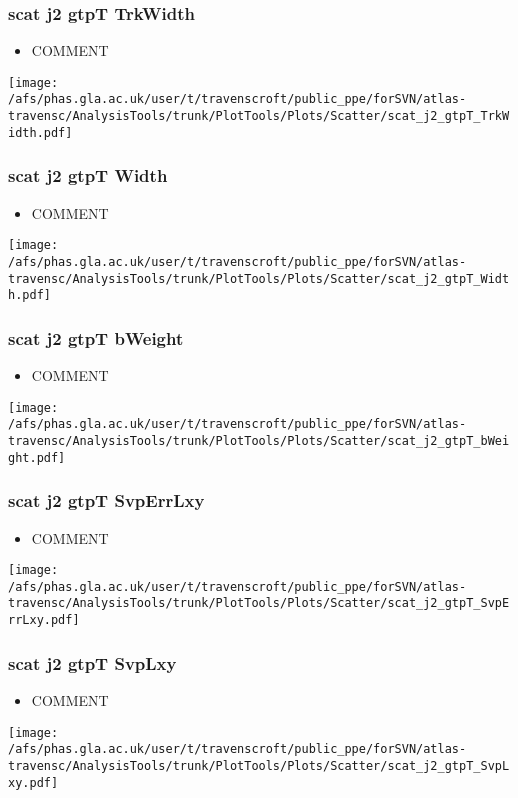 \documentclass{beamer}
\begin{document}
\begin{frame}
\frametitle{scat j2 gtpT TrkWidth}
\begin{itemize}
\item COMMENT
\end{itemize}
\begin{center}
\texttt{[image: /afs/phas.gla.ac.uk/user/t/travenscroft/public\_ppe/forSVN/atlas-travensc/AnalysisTools/trunk/PlotTools/Plots/Scatter/scat\_j2\_gtpT\_TrkWidth.pdf]}
\end{center}
\end{frame}

\begin{frame}
\frametitle{scat j2 gtpT Width}
\begin{itemize}
\item COMMENT
\end{itemize}
\begin{center}
\texttt{[image: /afs/phas.gla.ac.uk/user/t/travenscroft/public\_ppe/forSVN/atlas-travensc/AnalysisTools/trunk/PlotTools/Plots/Scatter/scat\_j2\_gtpT\_Width.pdf]}
\end{center}
\end{frame}

\begin{frame}
\frametitle{scat j2 gtpT bWeight}
\begin{itemize}
\item COMMENT
\end{itemize}
\begin{center}
\texttt{[image: /afs/phas.gla.ac.uk/user/t/travenscroft/public\_ppe/forSVN/atlas-travensc/AnalysisTools/trunk/PlotTools/Plots/Scatter/scat\_j2\_gtpT\_bWeight.pdf]}
\end{center}
\end{frame}

\begin{frame}
\frametitle{scat j2 gtpT SvpErrLxy}
\begin{itemize}
\item COMMENT
\end{itemize}
\begin{center}
\texttt{[image: /afs/phas.gla.ac.uk/user/t/travenscroft/public\_ppe/forSVN/atlas-travensc/AnalysisTools/trunk/PlotTools/Plots/Scatter/scat\_j2\_gtpT\_SvpErrLxy.pdf]}
\end{center}
\end{frame}

\begin{frame}
\frametitle{scat j2 gtpT SvpLxy}
\begin{itemize}
\item COMMENT
\end{itemize}
\begin{center}
\texttt{[image: /afs/phas.gla.ac.uk/user/t/travenscroft/public\_ppe/forSVN/atlas-travensc/AnalysisTools/trunk/PlotTools/Plots/Scatter/scat\_j2\_gtpT\_SvpLxy.pdf]}
\end{center}
\end{frame}
\end{document}
